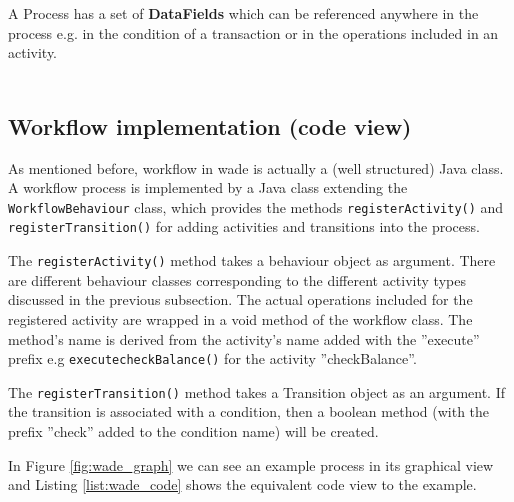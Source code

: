 A Process has a set of \textbf{DataFields} which can be referenced anywhere in the process e.g. in the condition of a transaction or in the operations included in an activity. 
\\\\

\subsection{Workflow implementation (code view)}
As mentioned before, workflow in wade is actually a (well structured) Java class. A workflow process is implemented by a Java class extending the \verb|WorkflowBehaviour| class, which provides the methods \verb|registerActivity()| and \verb|registerTransition()| for adding activities and transitions into the process. 

The \verb|registerActivity()| method takes a behaviour object as argument. There are different behaviour classes corresponding to the different activity types discussed in the previous subsection. The actual operations included for the registered activity are wrapped in a void method of the workflow class. The method's name is derived from the activity's name added with the ''execute'' prefix e.g \verb|executecheckBalance()| for the activity ''checkBalance''.  

The \verb|registerTransition()| method takes a Transition object as an argument. If the transition is associated with a condition, then a boolean method (with the prefix ''check'' added to the condition name) will be created.

In Figure \ref{fig:wade_graph} we can see an example process in its graphical view and Listing \ref{list:wade_code} shows the equivalent code view to the example. 


